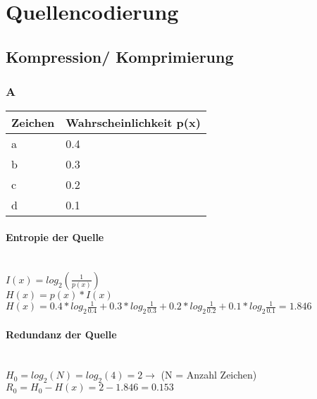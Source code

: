 

\section{Quellencodierung}

\subsection{Kompression/ Komprimierung}

\subsubsection{A}
\begin{center}
    \centering
    \begin{tabular}{l | l}
        \bfseries{Zeichen} & \bfseries{Wahrscheinlichkeit p(x)}\\ \hline
        a & 0.4\\ 
        b & 0.3\\
        c & 0.2\\
        d & 0.1\\
    \end{tabular}
\end{center}

\paragraph{Entropie der Quelle}\mbox{}\\
$I(x) = log_{2}(\frac{1}{p(x)})$\\
$H(x) = p(x)*I(x)$\\
$H(x) = 0.4*log_2\frac{1}{0.4}+0.3*log_2\frac{1}{0.3}+0.2*log_2\frac{1}{0.2}+0.1*log_2\frac{1}{0.1}=1.846$

\paragraph{Redundanz der Quelle}\mbox{}\\
$H_0 = log_2(N) = log_2(4) = 2 \rightarrow$ (N = Anzahl Zeichen)\\
$R_0 = H_0 - H(x) = 2-1.846=0.153$

